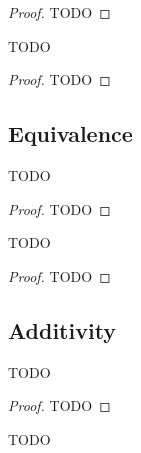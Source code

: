 \begin{proof}
    \leanok
    TODO
\end{proof}

\begin{lemma}
    \label{lemma:asymp_le_of_ge}
    \leanok
    TODO

\end{lemma}

\begin{proof}
    \leanok
    TODO
\end{proof}


\subsection{Equivalence}

\begin{lemma}
    \label{lemma:asymp_ge_of_le}
    \leanok
    TODO

\end{lemma}

\begin{proof}
    \leanok
    TODO
\end{proof}

\begin{lemma}
    \label{lemma:asymp_le_ge_iff}
    \leanok
    TODO

\end{lemma}

\begin{proof}
    \leanok
    TODO
\end{proof}


\subsection{Additivity}

\begin{lemma}
    \label{lemma:asymp_le_add}
    \leanok
    TODO
\end{lemma}

\begin{proof}
    \leanok
    TODO
\end{proof}

\begin{lemma}
    \label{lemma:asymp_ge_add}
    \leanok
    TODO
\end{lemma}

